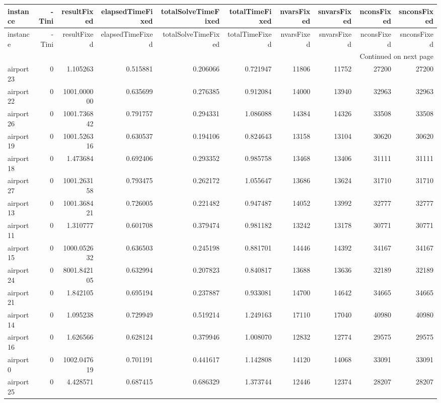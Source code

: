 \begin{longtable}{|l|r|r|r|r|r|r|r|r|r|}
\toprule
instance & -Tini & resultFixed & elapsedTimeFixed & totalSolveTimeFixed & totalTimeFixed & nvarsFixed & snvarsFixed & nconsFixed & snconsFixed \\
\midrule
\endfirsthead
\toprule
instance & -Tini & resultFixed & elapsedTimeFixed & totalSolveTimeFixed & totalTimeFixed & nvarsFixed & snvarsFixed & nconsFixed & snconsFixed \\
\midrule
\endhead
\midrule
\multicolumn{10}{r}{Continued on next page} \\
\midrule
\endfoot
\bottomrule
\endlastfoot
airport23 & 0 & 1.105263 & 0.515881 & 0.206066 & 0.721947 & 11806 & 11752 & 27200 & 27200 \\
airport22 & 0 & 1001.000000 & 0.635699 & 0.276385 & 0.912084 & 14000 & 13940 & 32963 & 32963 \\
airport26 & 0 & 1001.736842 & 0.791757 & 0.294331 & 1.086088 & 14384 & 14326 & 33508 & 33508 \\
airport19 & 0 & 1001.526316 & 0.630537 & 0.194106 & 0.824643 & 13158 & 13104 & 30620 & 30620 \\
airport18 & 0 & 1.473684 & 0.692406 & 0.293352 & 0.985758 & 13468 & 13406 & 31111 & 31111 \\
airport27 & 0 & 1001.263158 & 0.793475 & 0.262172 & 1.055647 & 13686 & 13624 & 31710 & 31710 \\
airport13 & 0 & 1001.368421 & 0.726005 & 0.221482 & 0.947487 & 14052 & 13992 & 32777 & 32777 \\
airport11 & 0 & 1.310777 & 0.601708 & 0.379474 & 0.981182 & 13242 & 13178 & 30771 & 30771 \\
airport15 & 0 & 1000.052632 & 0.636503 & 0.245198 & 0.881701 & 14446 & 14392 & 34167 & 34167 \\
airport24 & 0 & 8001.842105 & 0.632994 & 0.207823 & 0.840817 & 13688 & 13636 & 32189 & 32189 \\
airport21 & 0 & 1.842105 & 0.695194 & 0.237887 & 0.933081 & 14700 & 14642 & 34665 & 34665 \\
airport14 & 0 & 1.095238 & 0.729949 & 0.519214 & 1.249163 & 17110 & 17040 & 40980 & 40980 \\
airport16 & 0 & 1.626566 & 0.628124 & 0.379946 & 1.008070 & 12832 & 12774 & 29575 & 29575 \\
airport0 & 0 & 1002.047619 & 0.701191 & 0.441617 & 1.142808 & 14120 & 14068 & 33091 & 33091 \\
airport25 & 0 & 4.428571 & 0.687415 & 0.686329 & 1.373744 & 12446 & 12374 & 28207 & 28207 \\

\end{longtable}
